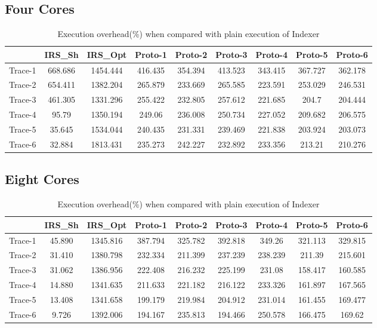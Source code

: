\subsection{Four Cores}
\begin{table}[h]
\begin{center}
 \begin{tabular}{|c c c c c c c c c|} 
 \hline
 & IRS\_Sh & IRS\_Opt& Proto-1 & Proto-2 & Proto-3 & Proto-4 & Proto-5 & Proto-6\\ %
 \hline
Trace-1 & 668.686 & 1454.444 & 416.435 & 354.394 & 413.523 & 343.415 & 367.727 & 362.178\\
Trace-2 & 654.411 & 1382.204 & 265.879 & 233.669 & 265.585 & 223.591 & 253.029 & 246.531\\
Trace-3 & 461.305 & 1331.296 & 255.422 & 232.805 & 257.612 & 221.685 & 204.7 & 204.444\\
Trace-4 & 95.79 & 1350.194 & 249.06 & 236.008 & 250.734 & 227.052 & 209.682 & 206.575\\
Trace-5 & 35.645 & 1534.044 & 240.435 & 231.331 & 239.469 & 221.838 & 203.924 & 203.073\\
Trace-6 & 32.884 & 1813.431 & 235.273 & 242.227 & 232.892 & 233.356 & 213.21 & 210.276\\
\hline
\end{tabular}
\end{center}
\caption{Execution overhead(\%) when compared with plain execution of Indexer}
\label{indexer_irs_res_cores_4}
\end{table}
\newpage
\subsection{Eight Cores}
\begin{table}[h]
\begin{center}
 \begin{tabular}{|c c c c c c c c c|} 
 \hline
 & IRS\_Sh & IRS\_Opt& Proto-1 & Proto-2 & Proto-3 & Proto-4 & Proto-5 & Proto-6\\ %
 \hline
Trace-1 & 45.890 & 1345.816 & 387.794 & 325.782 & 392.818 & 349.26 & 321.113 & 329.815\\
Trace-2 & 31.410 & 1380.798 & 232.334 & 211.399 & 237.239 & 238.239 & 211.39 & 215.601\\
Trace-3 & 31.062 & 1386.956 & 222.408 & 216.232 & 225.199 & 231.08 & 158.417 & 160.585\\
Trace-4 & 14.880 & 1341.635 & 211.633 & 221.182 & 216.122 & 233.326 & 161.897 & 167.565\\
Trace-5 & 13.408 & 1341.658 & 199.179 & 219.984 & 204.912 & 231.014 & 161.455 & 169.477\\
Trace-6 & 9.726 & 1392.006 & 194.167 & 235.813 & 194.466 & 250.578 & 166.475 & 169.62\\
\hline
\end{tabular}
\end{center}
\caption{Execution overhead(\%) when compared with plain execution of Indexer}
\label{indexer_irs_res_cores_8}
\end{table}


